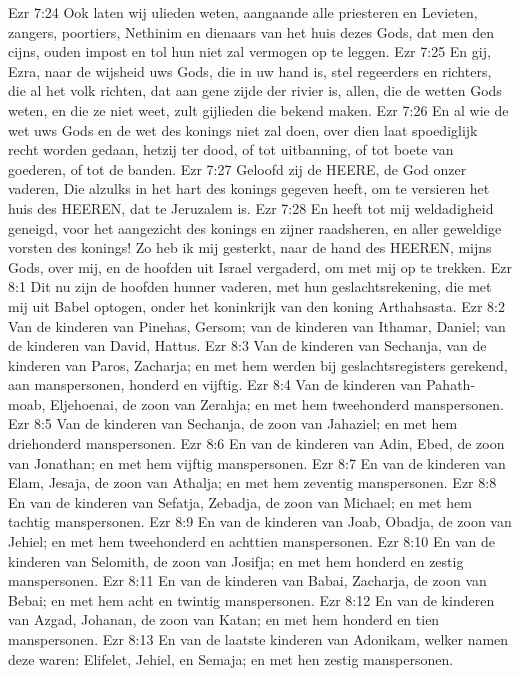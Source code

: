 Ezr 7:24  Ook laten wij ulieden weten, aangaande alle priesteren en Levieten, zangers, poortiers, Nethinim en dienaars van het huis dezes Gods, dat men den cijns, ouden impost en tol hun niet zal vermogen op te leggen.
Ezr 7:25  En gij, Ezra, naar de wijsheid uws Gods, die in uw hand is, stel regeerders en richters, die al het volk richten, dat aan gene zijde der rivier is, allen, die de wetten Gods weten, en die ze niet weet, zult gijlieden die bekend maken.
Ezr 7:26  En al wie de wet uws Gods en de wet des konings niet zal doen, over dien laat spoediglijk recht worden gedaan, hetzij ter dood, of tot uitbanning, of tot boete van goederen, of tot de banden.
Ezr 7:27  Geloofd zij de HEERE, de God onzer vaderen, Die alzulks in het hart des konings gegeven heeft, om te versieren het huis des HEEREN, dat te Jeruzalem is.
Ezr 7:28  En heeft tot mij weldadigheid geneigd, voor het aangezicht des konings en zijner raadsheren, en aller geweldige vorsten des konings! Zo heb ik mij gesterkt, naar de hand des HEEREN, mijns Gods, over mij, en de hoofden uit Israel vergaderd, om met mij op te trekken.
Ezr 8:1  Dit nu zijn de hoofden hunner vaderen, met hun geslachtsrekening, die met mij uit Babel optogen, onder het koninkrijk van den koning Arthahsasta.
Ezr 8:2  Van de kinderen van Pinehas, Gersom; van de kinderen van Ithamar, Daniel; van de kinderen van David, Hattus.
Ezr 8:3  Van de kinderen van Sechanja, van de kinderen van Paros, Zacharja; en met hem werden bij geslachtsregisters gerekend, aan manspersonen, honderd en vijftig.
Ezr 8:4  Van de kinderen van Pahath-moab, Eljehoenai, de zoon van Zerahja; en met hem tweehonderd manspersonen.
Ezr 8:5  Van de kinderen van Sechanja, de zoon van Jahaziel; en met hem driehonderd manspersonen.
Ezr 8:6  En van de kinderen van Adin, Ebed, de zoon van Jonathan; en met hem vijftig manspersonen.
Ezr 8:7  En van de kinderen van Elam, Jesaja, de zoon van Athalja; en met hem zeventig manspersonen.
Ezr 8:8  En van de kinderen van Sefatja, Zebadja, de zoon van Michael; en met hem tachtig manspersonen.
Ezr 8:9  En van de kinderen van Joab, Obadja, de zoon van Jehiel; en met hem tweehonderd en achttien manspersonen.
Ezr 8:10  En van de kinderen van Selomith, de zoon van Josifja; en met hem honderd en zestig manspersonen.
Ezr 8:11  En van de kinderen van Babai, Zacharja, de zoon van Bebai; en met hem acht en twintig manspersonen.
Ezr 8:12  En van de kinderen van Azgad, Johanan, de zoon van Katan; en met hem honderd en tien manspersonen.
Ezr 8:13  En van de laatste kinderen van Adonikam, welker namen deze waren: Elifelet, Jehiel, en Semaja; en met hen zestig manspersonen.
